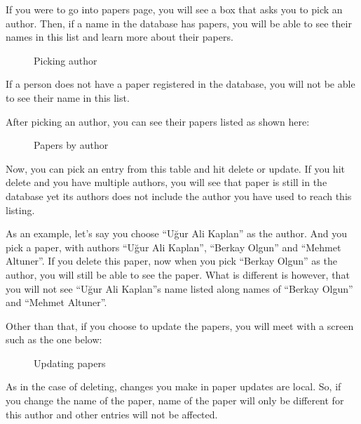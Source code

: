 \documentclass[letterpaper,10pt,english]{sphinxmanual}
\begin{document}
If you were to go into papers page, you will see a box that asks you
to pick an author. Then, if a name in the database has papers, you will
be able to see their names in this list and learn more about their papers.

\begin{figure}[htbp]
\centering
\capstart

\noindent{}
\caption{Picking author}\label{\detokenize{user/kaplan:id1}}\end{figure}

If a person does not have a paper registered in the database, you will not
be able to see their name in this list.

After picking an author, you can see their papers listed as shown here:

\begin{figure}[htbp]
\centering
\capstart

\noindent{}
\caption{Papers by author}\label{\detokenize{user/kaplan:id2}}\end{figure}

Now, you can pick an entry from this table and hit delete or update. If you
hit delete and you have multiple authors, you will see that paper is still in
the database yet its authors does not include the author you have used to
reach this listing.

As an example, let’s say you choose “Uğur Ali Kaplan” as the author. And you
pick a paper, with authors “Uğur Ali Kaplan”, “Berkay Olgun” and “Mehmet Altuner”.
If you delete this paper, now when you pick “Berkay Olgun” as the author, you will
still be able to see the paper. What is different is however, that you will not
see “Uğur Ali Kaplan”s name listed along names of “Berkay Olgun” and “Mehmet Altuner”.

Other than that, if you choose to update the papers, you will meet with a screen
such as the one below:

\begin{figure}[htbp]
\centering
\capstart

\noindent{}
\caption{Updating papers}\label{\detokenize{user/kaplan:id3}}\end{figure}

As in the case of deleting, changes you make in paper updates are local. So, if you change the name
of the paper, name of the paper will only be different for this author and other entries
will not be affected.
\end{document}
